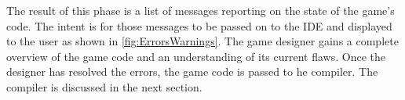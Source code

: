 The result of this phase is a list of messages reporting on the state of the game's code. The intent is for those messages to be passed on to the IDE and displayed to the user as shown in \ref{fig:ErrorsWarnings}. The game designer gains a complete overview of the game code and an understanding of its current flaws. Once the designer has resolved the errors, the game code is passed to he compiler. The compiler is discussed in the next section.

